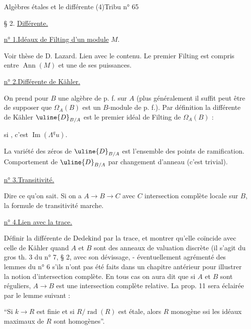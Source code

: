 
Algèbres étales et le différente (4)\hfill Tribu n° 65

§ 2. \uline{Différente.}

\uline{n° 1.}\quad \uline{Idéaux de Filting d'un module} $M$.

Voir thèse de D. Lazard. Lien avec le contenu. Le premier Filting est compris entre $\operatorname{Ann}(M)$ et une de ses puissances.

\uline{n° 2.}\quad \uline{Différente de Kähler.}

On prend pour $B$ une algèbre de p. f. sur $A$ (plus généralement il suffit peut être de supposer que $\Omega_A(B)$ est un $B$-module de p. f.). Par définition la différente de Kähler $\uline{D}_{B/A}$ est le premier idéal de Filting de $\Omega_A(B)$ :

si
, c'est $\operatorname{Im}(\Lambda^q u)$.

La variété des zéros de $\uline{D}_{B/A}$ est l'ensemble des points de ramification. Comportement de $\uline{D}_{B/A}$ par changement d'anneau (c'est trivial).

\uline{n° 3.}\quad \uline{Transitivité.}

Dire ce qu'on sait. Si on a $A\to B\to C$ avec $C$ intersection complète locale sur $B$, la formule de transitivité marche.

\uline{n° 4.}\quad \uline{Lien avec la trace.}

Définir la différente de Dedekind par la trace, et montrer qu'elle coïncide avec celle de Kähler quand $A$ et $B$ sont des anneaux de valuation discrète (il s'agit du gros th. 3 du n° 7, § 2, avec son dévissage, - éventuellement agrémenté des lemmes du n° 6 s'ils n'ont pas été faits dans un chapitre antérieur pour illustrer la notion d'intersection complète. En tous cas on aura dit que si $A$ et $B$ sont réguliers, $A\to B$ est une intersection complète relative. La prop. 11 sera éclairée par le lemme suivant :

``Si $k\to R$ est finie et si $R/\operatorname{rad}(R)$ est étale, alors $R$ monogène ssi les idéaux maximaux de $R$ sont homogènes''.

